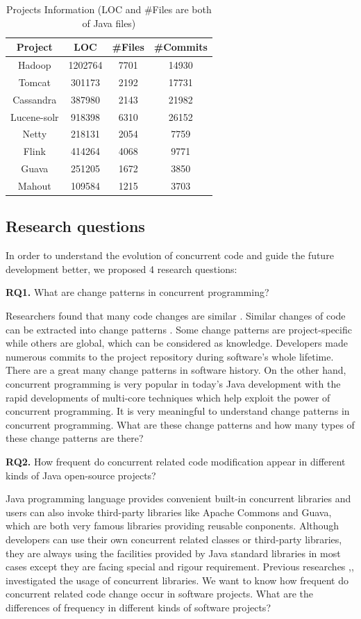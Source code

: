 \documentclass[conference]{IEEEtran}
\begin{document}
\begin{table}
	\centering
	\caption{Projects Information (LOC and \#Files are both of Java files)}
	\begin{tabular}{|c|c|c|c|}\hline
		Project&LOC&\#Files&\#Commits\\\hline
		Hadoop&1202764&7701&14930\\\hline
		Tomcat&301173&2192&17731\\\hline
		Cassandra&387980&2143&21982\\\hline
		Lucene-solr&918398&6310&26152\\\hline
		Netty&218131&2054&7759\\\hline
		Flink&414264&4068&9771\\\hline
		Guava&251205&1672&3850\\\hline
		Mahout&109584&1215&3703\\\hline
	\end{tabular}
\end{table}

\subsection{Research questions}
In order to understand the evolution of concurrent code and guide the future development better, we proposed 4 research questions:

\textbf{RQ1.} What are change patterns in concurrent programming?

Researchers found that many code changes are similar \cite{conf/icse/KimN09}. Similar changes of code can be extracted into change patterns \cite{conf/icsm/MartinezDM13}. Some change patterns are project-specific while others are global, which can be considered as knowledge. Developers made numerous commits to the project repository during software's whole lifetime. There are a great many change patterns in software history. On the other hand, concurrent programming is very popular in today's Java development with the rapid developments of multi-core techniques which help exploit the power of concurrent programming. It is very meaningful to understand change patterns in concurrent programming. What are these change patterns and how many types of these change patterns are there?

\textbf{RQ2.} How frequent do concurrent related code modification appear in different kinds of Java open-source projects?

Java programming language provides convenient built-in concurrent libraries and users can also invoke third-party libraries like Apache Commons and Guava, which are both very famous libraries providing reusable conponents. Although developers can use their own concurrent related classes or third-party libraries, they are always using the facilities provided by Java standard libraries in most cases except they are facing special and rigour requirement. Previous researches \cite{journals/jss/PintoTFFB15},\cite{journals/infsof/WuCZX16},\cite{conf/sigsoft/OkurD12} investigated the usage of concurrent libraries. We want to know how frequent do concurrent related code change occur in software projects. What are the differences of frequency in different kinds of software projects?
\end{document}
